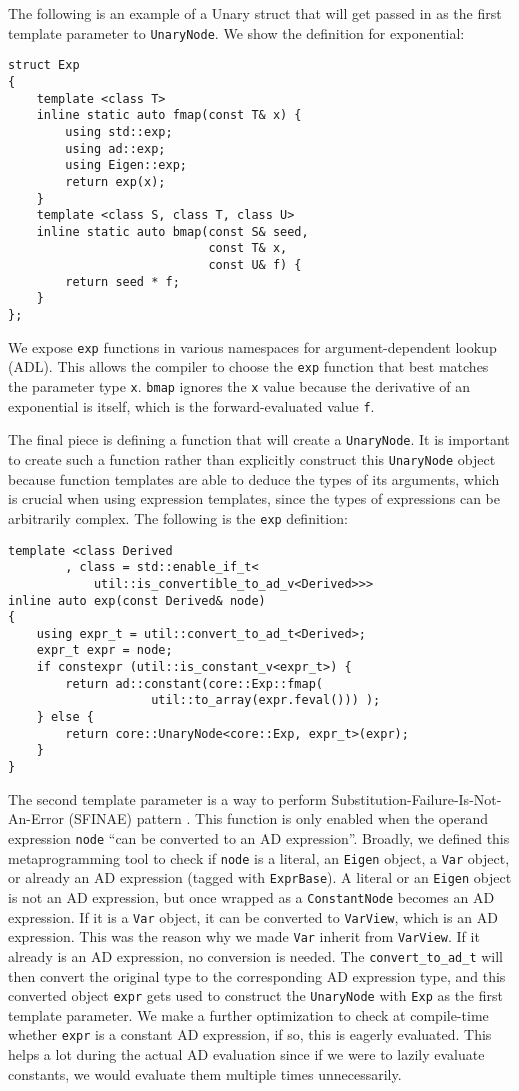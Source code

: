 The following is an example of a Unary struct that will get passed in 
as the first template parameter to \verb|UnaryNode|.
We show the definition for exponential:
\begin{lstlisting}[style=customcpp]
struct Exp
{
    template <class T>
	inline static auto fmap(const T& x) {
        using std::exp;
        using ad::exp;
        using Eigen::exp;
        return exp(x);
	}
    template <class S, class T, class U> 
	inline static auto bmap(const S& seed,
                            const T& x,
                            const U& f) {
        return seed * f;
	}
};
\end{lstlisting}
We expose \verb|exp| functions in various namespaces for argument-dependent lookup (ADL).
This allows the compiler to choose the \verb|exp| function that best matches
the parameter type \verb|x|.
\verb|bmap| ignores the \verb|x| value because the derivative of an exponential
is itself, which is the forward-evaluated value \verb|f|.

The final piece is defining a function that will create a \verb|UnaryNode|.
It is important to create such a function rather than explicitly
construct this \verb|UnaryNode| object because function templates
are able to deduce the types of its arguments, which is crucial when using expression templates,
since the types of expressions can be arbitrarily complex.
The following is the \verb|exp| definition:
\begin{lstlisting}[style=customcpp]
template <class Derived
        , class = std::enable_if_t<
            util::is_convertible_to_ad_v<Derived>>> 
inline auto exp(const Derived& node) 
{ 
    using expr_t = util::convert_to_ad_t<Derived>;
    expr_t expr = node;
    if constexpr (util::is_constant_v<expr_t>) { 
        return ad::constant(core::Exp::fmap(
                    util::to_array(expr.feval())) ); 
    } else { 
        return core::UnaryNode<core::Exp, expr_t>(expr); 
    } 
}
\end{lstlisting}
The second template parameter is a way to perform 
Substitution-Failure-Is-Not-An-Error (SFINAE) pattern .
This function is only enabled when the operand expression \verb|node|
``can be converted to an AD expression''.
Broadly, we defined this metaprogramming tool to check if 
\verb|node| is a literal, an \verb|Eigen| object, 
a \verb|Var| object,
or already an AD expression (tagged with \verb|ExprBase|).
A literal or an \verb|Eigen| object is not an AD expression,
but once wrapped as a \verb|ConstantNode| becomes an AD expression.
If it is a \verb|Var| object, it can be converted to \verb|VarView|, which is an AD expression.
This was the reason why we made \verb|Var| inherit from \verb|VarView|.
If it already is an AD expression, no conversion is needed.
The \verb|convert_to_ad_t| will then convert the original type to the corresponding AD expression type,
and this converted object \verb|expr| gets used 
to construct the \verb|UnaryNode| with \verb|Exp| as the first template parameter.
We make a further optimization to check at compile-time whether \verb|expr|
is a constant AD expression, if so, this is eagerly evaluated.
This helps a lot during the actual AD evaluation since if we were to lazily evaluate constants,
we would evaluate them multiple times unnecessarily.
